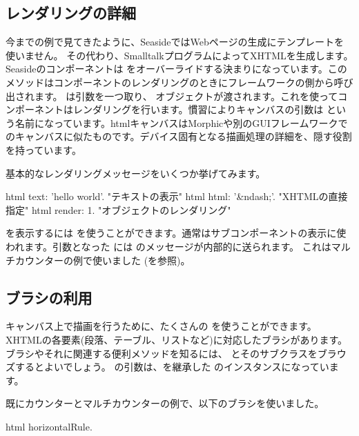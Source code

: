 \documentclass[a4paper,10pt,twoside]{book}
\begin{document}
\subsection{レンダリングの詳細}

今までの例で見てきたように、SeasideではWebページの生成にテンプレートを使いません。
その代わり、SmalltalkプログラムによってXHTMLを生成します。
Seasideのコンポーネントは  をオーバーライドする決まりになっています。このメソッドはコンポーネントのレンダリングのときにフレームワークの側から呼び出されます。
 は引数を一つ取り、  オブジェクトが渡されます。これを使ってコンポーネントはレンダリングを行います。慣習によりキャンバスの引数は  という名前になっています。htmlキャンバスはMorphicや別のGUIフレームワークでのキャンバスに似たものです。デバイス固有となる描画処理の詳細を、隠す役割を持っています。

基本的なレンダリングメッセージをいくつか挙げてみます。
\begin{code}{}
html text: 'hello world'.  "テキストの表示"
html html: '&ndash;'.     "XHTMLの直接指定"
html render: 1.              "オブジェクトのレンダリング"
\end{code}

を表示するには  を使うことができます。通常はサブコンポーネントの表示に使われます。引数となった には のメッセージが内部的に送られます。
これはマルチカウンターの例で使いました (を参照)。

\subsection{ブラシの利用}

キャンバス上で描画を行うために、たくさんの  を使うことができます。
XHTMLの各要素(段落、テーブル、リストなど)に対応したブラシがあります。
ブラシやそれに関連する便利メソッドを知るには、 とそのサブクラスをブラウズするとよいでしょう。
  の引数は、を継承した のインスタンスになっています。

既にカウンターとマルチカウンターの例で、以下のブラシを使いました。
\begin{code}{}
html horizontalRule.
\end{code}
\end{document}

